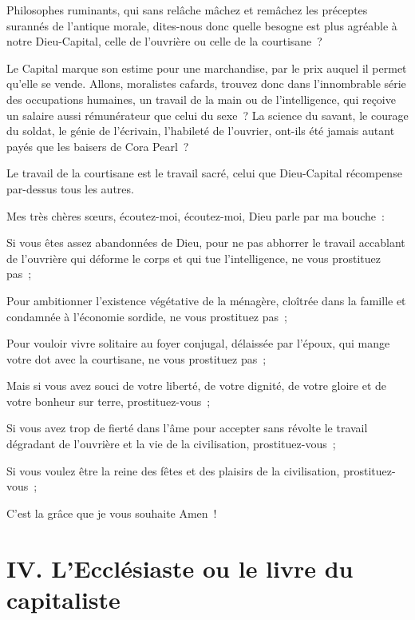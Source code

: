 \documentclass[french,twoside]{book} %
\newcommand\chapteropen{} %
\newcommand\chapterclose{} %
\begin{document}
Philosophes ruminants, qui sans relâche mâchez et remâchez les préceptes surannés de l’antique morale, dites-nous donc quelle besogne est plus agréable à notre Dieu-Capital, celle de l’ouvrière ou celle de la courtisane ?\par
Le Capital marque son estime pour une marchandise, par le prix auquel il permet qu’elle se vende. Allons, moralistes cafards, trouvez donc dans l’innombrable série des occupations humaines, un travail de la main ou de l’intelligence, qui reçoive un salaire aussi rémunérateur que celui du sexe ? La science du savant, le courage du soldat, le génie de l’écrivain, l’habileté de l’ouvrier, ont-ils été jamais autant payés que les baisers de Cora Pearl ?\par
Le travail de la courtisane est le travail sacré, celui que Dieu-Capital récompense par-dessus tous les autres.\par
Mes très chères sœurs, écoutez-moi, écoutez-moi, Dieu parle par ma bouche :\par
Si vous êtes assez abandonnées de Dieu, pour ne pas abhorrer le travail accablant de l’ouvrière qui déforme le corps et qui tue l’intelligence, ne vous prostituez pas ;\par
Pour ambitionner l’existence végétative de la ménagère, cloîtrée dans la famille et condamnée à l’économie sordide, ne vous prostituez pas ;\par
Pour vouloir vivre solitaire au foyer conjugal, délaissée par l’époux, qui mange votre dot avec la courtisane, ne vous prostituez pas ;\par
Mais si vous avez souci de votre liberté, de votre dignité, de votre gloire et de votre bonheur sur terre, prostituez-vous ;\par
Si vous avez trop de fierté dans l’âme pour accepter sans révolte le travail dégradant de l’ouvrière et la vie de la civilisation, prostituez-vous ;\par
Si vous voulez être la reine des fêtes et des plaisirs de la civilisation, prostituez-vous ;\par
C'est la grâce que je vous souhaite Amen !
\chapterclose


\chapteropen
\chapter[{IV. L'Ecclésiaste ou le livre du capitaliste}]{IV. L'Ecclésiaste ou le livre du capitaliste}\renewcommand{\leftmark}{IV. L'Ecclésiaste ou le livre du capitaliste}
\end{document}
